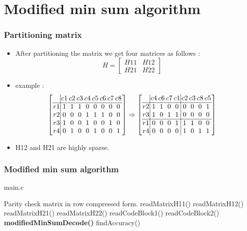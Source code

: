 \documentclass[xcolor=dvipsname]
{beamer}
\begin{document}
\section{ Modified min sum algorithm}
\begin{frame}[t]
\frametitle{ Partitioning matrix  }  
\begin{itemize}
\item After partitioning the matrix we get four matrices as follows 	:
\[
H = \left[ \begin{array}{c|c}  
H11  & H12     \\ \hline
H21  & H22     \end{array} \right] 
\] 
\item example :
\[
\begingroup %
\setlength\arraycolsep{1pt}
\left[ \begin{array} {c|cccccccc} 
  &    c1 &   c2 &   c3 &  c4  &  c5  &  c6  &  c7  &  c8 \\ \hline
r1 &    1  &   1  &   1  &   0  &   0  &   0  &   0  &   0 \\
r2 &    0  &   0  &   0  &   1  &   1  &   1  &   0  &   0 \\ 
r3 &    1  &   0  &   0  &   1  &   0  &   0  &   1  &   0 \\
r4 &    0  &   1  &   0  &   0  &   1  &   0  &   0  &   1 \end{array} \right] 
     \Rightarrow
\left[ \begin{array} {c|cccc|cccc} 
  &    c4 &   c6 &   c7 &  c1  &  c2  &  c3  &  c8  &  c5 \\ \hline  
r2 &     1  &   1  &   0  &   0  &   0  &   0  &   0  &   1 \\
r3 &     1  &   0  &   1  &   1  &   0  &   0  &   0  &   0 \\ \hline
r1 &     0  &   0  &   0  &   1  &   1  &   1  &   0  &   0 \\
r4 &     0  &   0  &   0  &   0  &   1  &   0  &   1  &   1 \end{array} \right] 
\endgroup
\]
\item H12 and H21 are highly sparse.
\end{itemize}
\end{frame}







\begin{frame}[t]
\frametitle{ Modified min sum algorithm }                                 %
\alert{ main.c }
\begin{algorithmic}                   
    \REQUIRE Parity check matrix in row compressed form.
    \STATE readMatrixH11()
    \STATE readMatrixH12()
    \STATE readMatrixH21()
    \STATE readMatrixH22()
    \STATE readCodeBlock1()
    \STATE readCodeBlock2()
    \STATE \textbf{modifiedMinSumDecode()}
    \STATE findAccuracy()

\end{algorithmic}
\end{frame}
\end{document}
